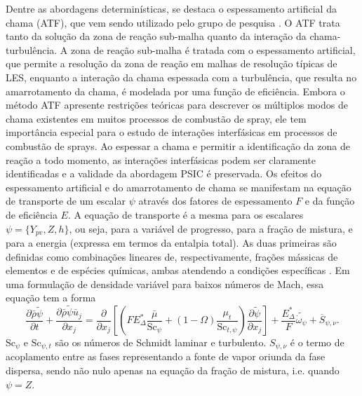 Dentre as abordagens determinísticas, se destaca o espessamento artificial da chama (ATF), que vem sendo utilizado pelo grupo de pesquisa \cite{SacomanoF2017PhD,SacomanoF2017CF,SacomanoF2020CF}.
O ATF trata tanto da solução da zona de reação sub-malha quanto da interação da chama-turbulência. 
A zona de reação sub-malha é tratada com o espessamento artificial, que permite a resolução da zona de reação em malhas de resolução típicas de LES, enquanto a interação da chama espessada com a turbulência, que resulta no amarrotamento da chama, é modelada por uma função de eficiência. 
Embora o método ATF apresente restrições teóricas para descrever os múltiplos modos de chama existentes em muitos processos de combustão de spray, ele tem importância especial para o estudo de interações interfásicas em processos de combustão de sprays. 
Ao espessar a chama e permitir a identificação da zona de reação a todo momento, as interações interfásicas podem ser claramente identificadas e a validade da abordagem PSIC é preservada.
Os efeitos do espessamento artificial e do amarrotamento de chama se manifestam na equação de transporte de um escalar $\psi$ através dos fatores de espessamento $F$ e da função de eficiência $E$.
A equação de transporte é a mesma para os escalares  $\psi=\lbrace Y_{pv}, Z, h\rbrace$, ou seja, para a variável de progresso, para a fração de mistura, e para a energia (expressa em termos da entalpia total). As duas primeiras são definidas como combinações lineares de, respectivamente, frações mássicas de elementos e de espécies químicas, ambas atendendo a condições específicas \cite{PoinsotVeynante2005,vanOijen2016PECS}.
Em uma formulação de densidade variável para baixos números de Mach, essa equação tem a forma
\begin{equation}
    \frac{\partial \bar \rho \widetilde \psi}{\partial t} + 
    \frac{\partial \bar \rho \widetilde \psi \overline u_j}{\partial x_j} =
    \frac{\partial }{\partial x_j} \left[ \left(
    FE^*_\Delta \frac{\bar\mu}{\text{Sc}_\psi} + (1-\Omega)\frac{\mu_t}{\text{Sc}_{t,\psi}}
    \right) \frac{\partial \widetilde \psi}{\partial x_j}
    \right] +
    \frac{E^*_\Delta}{F}\widetilde{\dot{\omega}_\psi} + 
    \overline S_{\psi,\nu}.
    \label{eq:FGM}
\end{equation}
$\text{Sc}_{\psi}$ e $\text{Sc}_{\psi,t}$ são os números de Schmidt laminar e turbulento.
$S_{\psi,\nu}$ é o termo de acoplamento entre as fases representando a fonte de vapor oriunda da fase dispersa, sendo não nulo apenas na equação da fração de mistura, i.e. quando $\psi=Z$.

